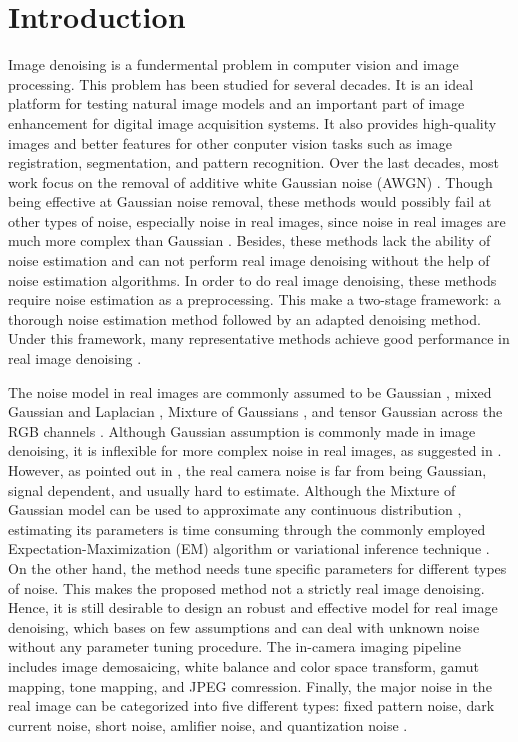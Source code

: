 \documentclass[10pt,twocolumn,letterpaper]{article}
\begin{document}
\section{Introduction}
Image denoising is a fundermental problem in computer vision and image processing. This problem has been studied for several decades. It is an ideal platform for testing natural image models and an important part of image enhancement for digital image acquisition systems. It also provides high-quality images and better features for other conputer vision tasks such as image registration,  segmentation, and pattern recognition. Over the last decades, most work focus on the removal of additive white Gaussian noise (AWGN) \cite{rudin1992nonlinear,nlm,foe,ksvd,bm3d,lssc,epll,pgpd,wnnm,csf,chen2015learning,burger2012image}. Though being effective at Gaussian noise removal, these methods would possibly fail at other types of noise, especially noise in real images, since noise in real images are much more complex than Gaussian \cite{noiseclinic}. Besides, these methods lack the ability of noise estimation and can not perform real image denoising without the help of noise estimation algorithms. In order to do real image denoising, these methods require noise estimation as a preprocessing. This make a two-stage framework: a thorough noise estimation method followed by an adapted denoising method. Under this framework, many representative methods achieve good performance in real image denoising \cite{fullyblind,rabie2005robust,Liu2008,almapg,noiseclinic,Zhu_2016_CVPR,crosschannel2016}.

The noise model in real images are commonly assumed to be Gaussian \cite{fullyblind,rabie2005robust,Liu2008}, mixed Gaussian and Laplacian \cite{almapg}, Mixture of Gaussians \cite{noiseclinic,Zhu_2016_CVPR}, and tensor Gaussian across the RGB channels \cite{crosschannel2016}. Although Gaussian assumption is commonly made in image denoising, it is inflexible for more complex noise in real images, as suggested in \cite{Liu2008,noiseclinic}. However, as pointed out in \cite{crosschannel2016}, the real camera noise is far from being Gaussian, signal dependent, and usually hard to estimate. Although the Mixture of Gaussian model can be used to approximate any continuous distribution \cite{Bishop}, estimating its parameters is time consuming through the commonly employed Expectation-Maximization (EM) algorithm \cite{em} or variational inference technique \cite{Bishop}. On the other hand, the method \cite{almapg} needs tune specific parameters for different types of noise. This makes the proposed method not a strictly real image denoising. Hence, it is still desirable to design an robust and effective model for real image denoising, which bases on few assumptions and can deal with unknown noise without any parameter tuning procedure. The in-camera imaging pipeline includes image demosaicing, white balance and color space transform, gamut mapping, tone mapping, and JPEG comression. Finally, the major noise in the real image can be categorized into five different types: fixed pattern noise, dark current noise, short noise, amlifier noise, and quantization noise \cite{tsin2001statistical}.
\end{document}
